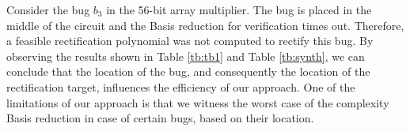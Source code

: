 Consider the bug $b_3$ in the 56-bit array multiplier. The bug is placed in the middle of the circuit and the \Grobner Basis reduction for verification times out. Therefore, a feasible rectification polynomial was not computed to rectify this bug. By observing the results shown in Table \ref{tb:tb1} and Table \ref{tb:synth}, we can conclude that the location of the bug, and consequently the location of the rectification target, influences the efficiency of our approach. One of the limitations of our approach is that we witness the worst case of the complexity \Grobner Basis reduction in case of certain bugs, based on their location. 




